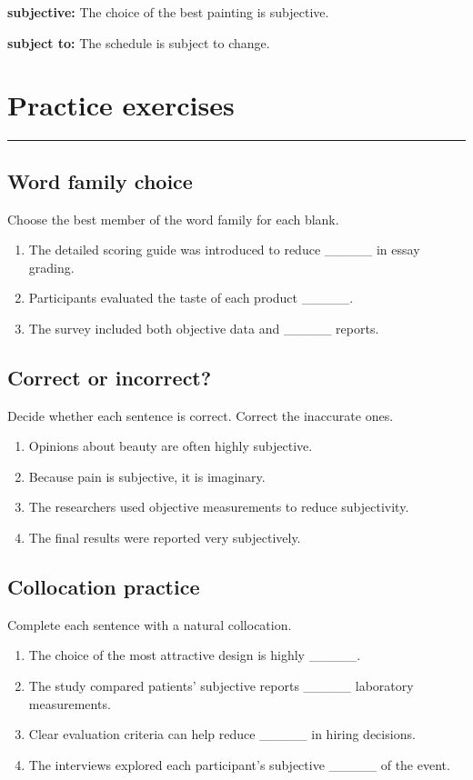 \documentclass[11pt]{article}
\newcommand{\sectionrule}{\par\vspace{-0.5em}\noindent\textcolor{Accent}{\rule{\linewidth}{0.6pt}}\par}
\begin{document}
\textbf{subjective:} The choice of the best painting is subjective.

\textbf{subject to:} The schedule is subject to change.

\section{Practice exercises}
\sectionrule
\subsection{Word family choice}
Choose the best member of the word family for each blank.

\begin{enumerate}
  \item The detailed scoring guide was introduced to reduce \_\_\_\_\_ in essay grading.
  \item Participants evaluated the taste of each product \_\_\_\_\_.
  \item The survey included both objective data and \_\_\_\_\_ reports.
\end{enumerate}

\subsection{Correct or incorrect?}
Decide whether each sentence is correct. Correct the inaccurate ones.

\begin{enumerate}
  \item Opinions about beauty are often highly subjective.
  \item Because pain is subjective, it is imaginary.
  \item The researchers used objective measurements to reduce subjectivity.
  \item The final results were reported very subjectively.
\end{enumerate}

\subsection{Collocation practice}
Complete each sentence with a natural collocation.

\begin{enumerate}
  \item The choice of the most attractive design is highly \_\_\_\_\_.
  \item The study compared patients' subjective reports \_\_\_\_\_ laboratory measurements.
  \item Clear evaluation criteria can help reduce \_\_\_\_\_ in hiring decisions.
  \item The interviews explored each participant's subjective \_\_\_\_\_ of the event.
\end{enumerate}
\end{document}
